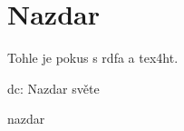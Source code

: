 \documentclass{article}
\begin{document}
\section{Nazdar}

Tohle je pokus s rdfa a tex4ht. 

\begin{subject}{dc:}
Nazdar světe

\begin{subject}{nazdar}
\end{subject}

\end{subject}
\end{document}
